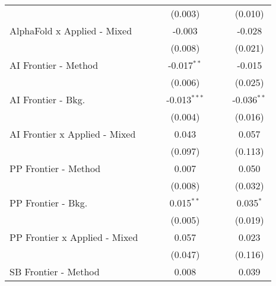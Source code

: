 \begin{tabular}{lcccccc}
                                 &                &                & (0.003)        &                &                & (0.010)\\   
   AlphaFold x Applied - Mixed   &                &                & -0.003         &                &                & -0.028\\   
                                 &                &                & (0.008)        &                &                & (0.021)\\   
   AI Frontier - Method          &                &                & -0.017$^{**}$  &                &                & -0.015\\   
                                 &                &                & (0.006)        &                &                & (0.025)\\   
   AI Frontier - Bkg.            &                &                & -0.013$^{***}$ &                &                & -0.036$^{**}$\\   
                                 &                &                & (0.004)        &                &                & (0.016)\\   
   AI Frontier x Applied - Mixed &                &                & 0.043          &                &                & 0.057\\   
                                 &                &                & (0.097)        &                &                & (0.113)\\   
   PP Frontier - Method          &                &                & 0.007          &                &                & 0.050\\   
                                 &                &                & (0.008)        &                &                & (0.032)\\   
   PP Frontier - Bkg.            &                &                & 0.015$^{**}$   &                &                & 0.035$^{*}$\\   
                                 &                &                & (0.005)        &                &                & (0.019)\\   
   PP Frontier x Applied - Mixed &                &                & 0.057          &                &                & 0.023\\   
                                 &                &                & (0.047)        &                &                & (0.116)\\   
   SB Frontier - Method          &                &                & 0.008          &                &                & 0.039\\   

\end{tabular}
